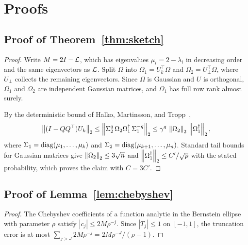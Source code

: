 \chapter{Proofs}
\label{app:proofs}

\section{Proof of Theorem~\ref{thm:sketch}}

\begin{proof}
Write $M = 2I - \mathcal{L}$, which has eigenvalues $\mu_i = 2 - \lambda_i$ in decreasing order and the same eigenvectors as $\mathcal{L}$. Split $\Omega$ into $\Omega_1 = U_k^\top \Omega$ and $\Omega_2 = U_{\perp}^\top \Omega$, where $U_\perp$ collects the remaining eigenvectors. Since $\Omega$ is Gaussian and $U$ is orthogonal, $\Omega_1$ and $\Omega_2$ are independent Gaussian matrices, and $\Omega_1$ has full row rank almost surely.

By the deterministic bound of Halko, Martinsson, and Tropp~\cite{halko2011finding},
\[
  \left\lVert (I - QQ^\top) U_k \right\rVert_2 \le \left\lVert \Sigma_2^{q} \, \Omega_2 \Omega_1^{\dagger} \, \Sigma_1^{-q} \right\rVert_2 \le \gamma^{q} \, \left\lVert \Omega_2 \right\rVert_2 \, \left\lVert \Omega_1^{\dagger} \right\rVert_2 ,
\]
where $\Sigma_1 = \operatorname{diag}(\mu_1, \dots, \mu_k)$ and $\Sigma_2 = \operatorname{diag}(\mu_{k+1}, \dots, \mu_n)$. Standard tail bounds for Gaussian matrices give $\left\lVert \Omega_2 \right\rVert_2 \le 3\sqrt{n}$ and $\left\lVert \Omega_1^{\dagger} \right\rVert_2 \le C' / \sqrt{p}$ with the stated probability, which proves the claim with $C = 3C'$.
\end{proof}

\section{Proof of Lemma~\ref{lem:chebyshev}}

\begin{proof}
The Chebyshev coefficients of a function analytic in the Bernstein ellipse with parameter $\rho$ satisfy $|c_j| \le 2M\rho^{-j}$. Since $|T_j| \le 1$ on $[-1, 1]$, the truncation error is at most $\sum_{j > J} 2M\rho^{-j} = 2M\rho^{-J} / (\rho - 1)$.
\end{proof}
